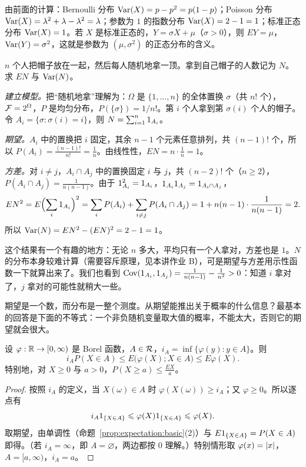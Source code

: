\begin{example}[常见分布的方差]
由前面的计算：Bernoulli 分布 $\operatorname{Var}(X)=p-p^2=p(1-p)$；Poisson 分布 $\operatorname{Var}(X)=\lambda^2+\lambda-\lambda^2=\lambda$；参数为 $1$ 的指数分布 $\operatorname{Var}(X)=2-1=1$；标准正态分布 $\operatorname{Var}(X)=1$。若 $X$ 是标准正态的，$Y=\sigma X+\mu$（$\sigma>0$），则 $EY=\mu$，$\operatorname{Var}(Y)=\sigma^2$，这就是参数为 $(\mu,\sigma^2)$ 的正态分布的含义。
\end{example}

\begin{workedexample}[配对问题]\label{we:expectation:matching}
$n$ 个人把帽子放在一起，然后每人随机地拿一顶。拿到自己帽子的人数记为 $N$。求 $EN$ 与 $\operatorname{Var}(N)$。
\end{workedexample}
\begin{solution}
\emph{建立模型。}把“随机地拿”理解为：$\Omega$ 是 $\{1,\dots,n\}$ 的全体置换 $\sigma$（共 $n!$ 个），$\mathcal{F}=2^\Omega$，$P$ 是均匀分布，$P(\{\sigma\})=1/n!$。第 $i$ 个人拿到第 $\sigma(i)$ 个人的帽子。令 $A_i=\{\sigma:\sigma(i)=i\}$，则 $N=\sum_{i=1}^n1_{A_i}$。

\emph{期望。}$A_i$ 中的置换把 $i$ 固定，其余 $n-1$ 个元素任意排列，共 $(n-1)!$ 个，所以 $P(A_i)=\frac{(n-1)!}{n!}=\frac1n$。由线性性，$EN=n\cdot\frac1n=1$。

\emph{方差。}对 $i\neq j$，$A_i\cap A_j$ 中的置换固定 $i$ 与 $j$，共 $(n-2)!$ 个（$n\geqslant2$），$P(A_i\cap A_j)=\frac1{n(n-1)}$。由于 $1_{A_i}^2=1_{A_i}$，$1_{A_i}1_{A_j}=1_{A_i\cap A_j}$，
\[
EN^2=E\Bigl(\sum_i1_{A_i}\Bigr)^2=\sum_iP(A_i)+\sum_{i\neq j}P(A_i\cap A_j)=1+n(n-1)\cdot\frac1{n(n-1)}=2 .
\]
所以 $\operatorname{Var}(N)=EN^2-(EN)^2=2-1=1$。

这个结果有一个有趣的地方：无论 $n$ 多大，平均只有一个人拿对，方差也是 $1$。$N$ 的分布本身较难计算（需要容斥原理，见本讲作业 B），可是期望与方差用示性函数一下就算出来了。我们也看到 $\operatorname{Cov}(1_{A_i},1_{A_j})=\frac1{n(n-1)}-\frac1{n^2}>0$：知道 $i$ 拿对了，$j$ 拿对的可能性就稍大一些。
\end{solution}


期望是一个数，而分布是一整个测度。从期望能推出关于概率的什么信息？最基本的回答是下面的不等式：一个非负随机变量取大值的概率，不能太大，否则它的期望就会很大。

\begin{theorem}\label{thm:expectation:markov}
设 $\varphi:\mathbb{R}\to[0,\infty)$ 是 Borel 函数，$A\in\mathcal{R}$，$i_A=\inf\{\varphi(y):y\in A\}$。则
\[
i_AP(X\in A)\leqslant E\bigl(\varphi(X);X\in A\bigr)\leqslant E\varphi(X).
\]
特别地，对 $X\geqslant0$ 与 $a>0$，$P(X\geqslant a)\leqslant\frac{EX}a$。
\end{theorem}
\begin{proof}
按照 $i_A$ 的定义，当 $X(\omega)\in A$ 时 $\varphi(X(\omega))\geqslant i_A$；又 $\varphi\geqslant0$。所以逐点有
\[
i_A1_{\{X\in A\}}\leqslant\varphi(X)1_{\{X\in A\}}\leqslant\varphi(X).
\]
取期望，由单调性（命题~\ref{prop:expectation:basic}(2)）与 $E1_{\{X\in A\}}=P(X\in A)$ 即得。（若 $i_A=\infty$，即 $A=\varnothing$，两边都按 $0$ 理解。）特别情形取 $\varphi(x)=\lvert x\rvert$，$A=[a,\infty)$，$i_A=a$。
\end{proof}

